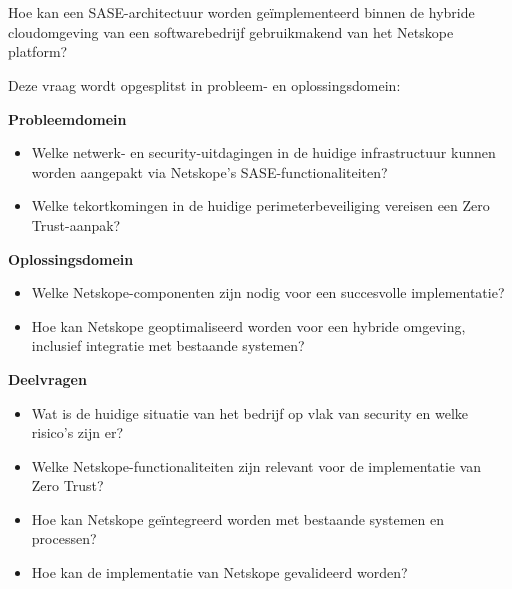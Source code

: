 \section{}%
\label{sec:onderzoeksvraag}


Hoe kan een SASE-architectuur worden geïmplementeerd binnen de hybride cloudomgeving van een softwarebedrijf gebruikmakend van het Netskope platform?

\vspace{2ex}

Deze vraag wordt opgesplitst in probleem- en oplossingsdomein:

\textbf{Probleemdomein}
\begin{itemize}
  \item Welke netwerk- en security-uitdagingen in de huidige infrastructuur kunnen worden aangepakt via Netskope's SASE-functionaliteiten?
  \item Welke tekortkomingen in de huidige perimeterbeveiliging vereisen een Zero Trust-aanpak?
\end{itemize}

\vspace{2ex}

\textbf{Oplossingsdomein}
\begin{itemize}
  \item Welke Netskope-componenten zijn nodig voor een succesvolle implementatie?
  \item Hoe kan Netskope geoptimaliseerd worden voor een hybride omgeving, inclusief integratie met bestaande systemen?
\end{itemize}

\vspace{2ex}

\textbf{Deelvragen}
\begin{itemize}
  \item Wat is de huidige situatie van het bedrijf op vlak van security en welke risico’s zijn er?
  \item Welke Netskope-functionaliteiten zijn relevant voor de implementatie van Zero Trust?
  \item Hoe kan Netskope geïntegreerd worden met bestaande systemen en processen?
  \item Hoe kan de implementatie van Netskope gevalideerd worden?
\end{itemize}

